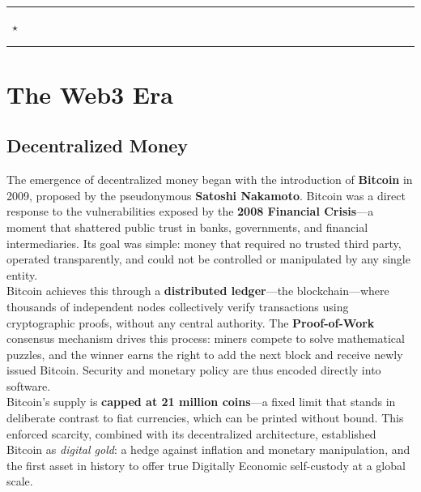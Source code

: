 \documentclass[12pt, a4paper, oneside]{report}
\theoremstyle{definition}
\begin{document}
\vspace{0.6cm}

\begin{center}
  \rule{0.4\linewidth}{0.3pt}~{\large $\star$}~\rule{0.4\linewidth}{0.3pt}
\end{center}




\chapter{The Web3 Era}
\section{Decentralized Money}
\label{chap:decentralized}

The emergence of decentralized money began with the introduction of \textbf{Bitcoin} 
in 2009, proposed by the pseudonymous \textbf{Satoshi Nakamoto}. Bitcoin was a direct 
response to the vulnerabilities exposed by the \textbf{2008 Financial Crisis}—a moment 
that shattered public trust in banks, governments, and financial intermediaries. Its 
goal was simple: money that required no trusted third party, operated transparently, 
and could not be controlled or manipulated by any single entity.\\[0.4cm]

Bitcoin achieves this through a \textbf{distributed ledger}—the blockchain—where 
thousands of independent nodes collectively verify transactions using cryptographic 
proofs, without any central authority. The \textbf{Proof-of-Work} consensus mechanism 
drives this process: miners compete to solve mathematical puzzles, and the winner earns 
the right to add the next block and receive newly issued Bitcoin. Security and monetary 
policy are thus encoded directly into software.\\[0.4cm]

Bitcoin's supply is \textbf{capped at 21 million coins}—a fixed limit that stands in 
deliberate contrast to fiat currencies, which can be printed without bound. This 
enforced scarcity, combined with its decentralized architecture, established Bitcoin 
as \emph{digital gold}: a hedge against inflation and monetary manipulation, and the 
first asset in history to offer true Digitally Economic self-custody at a global scale.\\[1.0cm]
\end{document}
